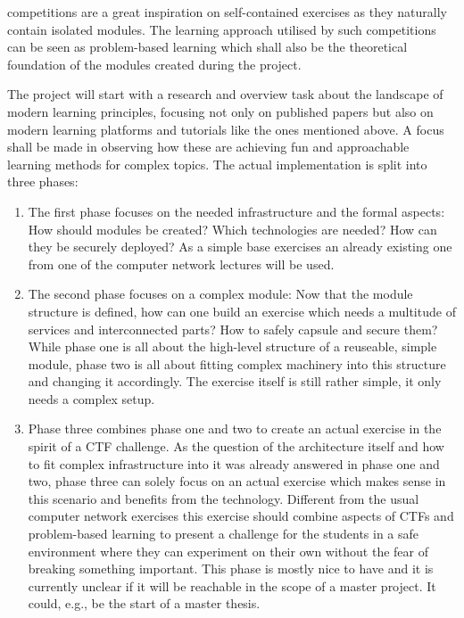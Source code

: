  competitions are a great inspiration on self-contained exercises as they naturally contain isolated modules.
The learning approach utilised by such competitions can be seen as problem-based learning which shall also be the theoretical foundation of the modules created during the project.

The project will start with a research and overview task about the landscape of modern learning principles, focusing not only on published papers but also on modern learning platforms and tutorials like the ones mentioned above.
A focus shall be made in observing how these are achieving fun and approachable learning methods for complex topics.  
The actual implementation is split into three phases:

\begin{enumerate}
    \item The first phase focuses on the needed infrastructure and the formal aspects:
    How should modules be created?
    Which technologies are needed?
    How can they be securely deployed?
    As a simple base exercises an already existing one from one of the computer network lectures will be used.
    \item The second phase focuses on a complex module: Now that the module structure is defined, how can one build an exercise which needs a multitude of services and interconnected parts?
    How to safely capsule and secure them?
    While phase one is all about the high-level structure of a reuseable, simple module,
    phase two is all about fitting complex machinery into this structure and changing it accordingly.
    The exercise itself is still rather simple, it only needs a complex setup.
    \item Phase three combines phase one and two to create an actual exercise in the spirit of a CTF challenge.
    As the question of the architecture itself and how to fit complex infrastructure into it was already answered in phase one and two, phase three can solely focus on an actual exercise which makes sense in this scenario and benefits from the technology.
    Different from the usual computer network exercises this exercise should combine aspects of CTFs and problem-based learning to present a challenge for the students in a safe environment where they can experiment on their own without the fear of breaking something important.
    This phase is mostly nice to have and it is currently unclear if it will be reachable in the scope of a master project.
    It could, e.g., be the start of a master thesis.
\end{enumerate}

